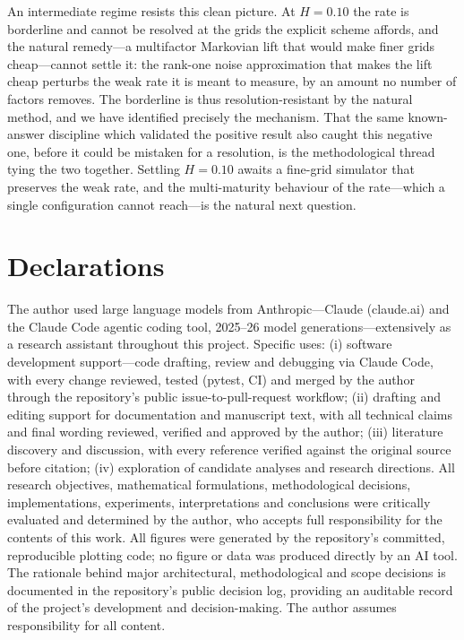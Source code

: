\documentclass{siamonline250211}
\begin{document}
An intermediate regime resists this clean picture. At $H=0.10$ the rate is borderline and
cannot be resolved at the grids the explicit scheme affords, and the natural remedy---a
multifactor Markovian lift that would make finer grids cheap---cannot settle it: the
rank-one noise approximation that makes the lift cheap perturbs the weak rate it is meant to
measure, by an amount no number of factors removes. The borderline is thus resolution-resistant
by the natural method, and we have identified precisely the mechanism. That the same
known-answer discipline which validated the positive result also caught this negative one,
before it could be mistaken for a resolution, is the methodological thread tying the two
together. Settling $H=0.10$ awaits a fine-grid simulator that preserves the weak rate, and the
multi-maturity behaviour of the rate---which a single configuration cannot reach---is the
natural next question.

\section*{Declarations}

The author used large language models from Anthropic---Claude (claude.ai) and the Claude
Code agentic coding tool, 2025--26 model generations---extensively as a research assistant
throughout this project. Specific uses: (i) software development support---code drafting,
review and debugging via Claude Code, with every change reviewed, tested (pytest, CI) and
merged by the author through the repository's public issue-to-pull-request workflow;
(ii) drafting and editing support for documentation and manuscript text, with all technical
claims and final wording reviewed, verified and approved by the author; (iii) literature
discovery and discussion, with every reference verified against the original source before
citation; (iv) exploration of candidate analyses and research directions. All research
objectives, mathematical formulations, methodological decisions, implementations,
experiments, interpretations and conclusions were critically evaluated and determined by
the author, who accepts full responsibility for the contents of this work. All figures
were generated by the repository's committed, reproducible plotting code; no figure or
data was produced directly by an AI tool. The rationale behind major architectural,
methodological and scope decisions is documented in the repository's public decision log,
providing an auditable record of the project's development and decision-making.
The author assumes responsibility for all content.
\end{document}
